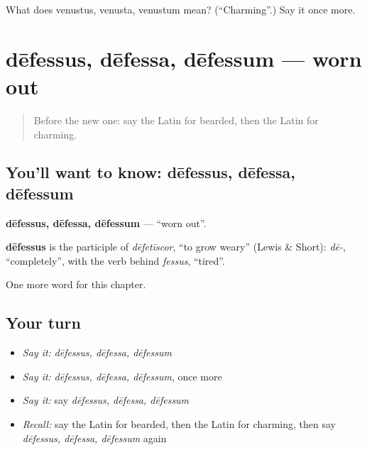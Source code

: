 \begin{tcolorbox}[breakable,colback=teal!4,colframe=teal!35!black,title={Before you move on}]
What does venustus, venusta, venustum mean? (\textquotedblleft{}Charming\textquotedblright{}.) Say it once more.
\end{tcolorbox}
\section[dēfessus, dēfessa, dēfessum]{dēfessus, dēfessa, dēfessum — worn out}

\label{lesson:LA-C216-defessus}



\begin{quote}
Before the new one: say the Latin for bearded, then the Latin for charming.
\end{quote}

\subsection*{You'll want to know: dēfessus, dēfessa, dēfessum}
\textbf{dēfessus, dēfessa, dēfessum} — \textquotedblleft{}worn out\textquotedblright{}.

\begin{cousinweb}
\textbf{dēfessus} is the participle of \emph{dēfetīscor}, \textquotedblleft{}to grow weary\textquotedblright{} (Lewis \& Short): \emph{dē-}, \textquotedblleft{}completely\textquotedblright{}, with the verb behind \emph{fessus}, \textquotedblleft{}tired\textquotedblright{}.
\end{cousinweb}

\begin{grammarlens}[title={What you've built}]
One more word for this chapter.
\end{grammarlens}

\subsection*{Your turn}
\begin{itemize}
\raggedright
  \item \emph{Say it:} \emph{dēfessus, dēfessa, dēfessum}
  \item \emph{Say it:} \emph{dēfessus, dēfessa, dēfessum}, once more
  \item \emph{Say it:} say \emph{dēfessus, dēfessa, dēfessum}
  \item \emph{Recall:} say the Latin for bearded, then the Latin for charming, then say \emph{dēfessus, dēfessa, dēfessum} again
\end{itemize}

